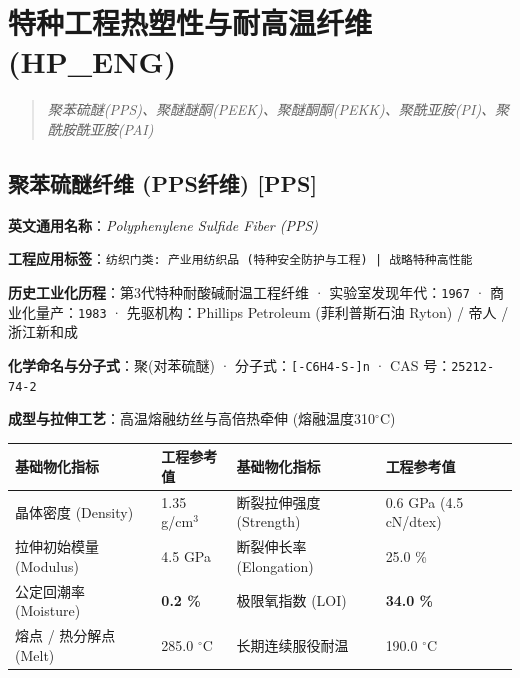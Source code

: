 \documentclass[11pt,openright,twoside,UTF8]{ctexbook}
\begin{document}
\chapter{特种工程热塑性与耐高温纤维 (HP\_ENG)}
\begin{quote}
\small\itshape
聚苯硫醚(PPS)、聚醚醚酮(PEEK)、聚醚酮酮(PEKK)、聚酰亚胺(PI)、聚酰胺酰亚胺(PAI)
\end{quote}

\section{聚苯硫醚纤维 (PPS纤维) [PPS]}
\label{sec:pps}

\noindent\textbf{英文通用名称}：\textit{Polyphenylene Sulfide Fiber (PPS)}\par
\noindent\textbf{工程应用标签}：\texttt{纺织门类: 产业用纺织品 (特种安全防护与工程) | 战略特种高性能}\par
\noindent\textbf{历史工业化历程}：第3代特种耐酸碱耐温工程纤维 · 实验室发现年代：\texttt{1967} · 商业化量产：\texttt{1983} · 先驱机构：Phillips Petroleum (菲利普斯石油 Ryton) / 帝人 / 浙江新和成\par
\noindent\textbf{化学命名与分子式}：聚(对苯硫醚) · 分子式：\texttt{[-C6H4-S-]n} · CAS 号：\texttt{25212-74-2}\par
\noindent\textbf{成型与拉伸工艺}：高温熔融纺丝与高倍热牵伸 (熔融温度310$^\circ\mathrm{C}$)\par

\vspace{0.15cm}
\begin{center}
\small
\begin{tabularx}{\textwidth}{p{3.8cm}Xp{3.8cm}X}
\toprule
\textbf{基础物化指标} & \textbf{工程参考值} & \textbf{基础物化指标} & \textbf{工程参考值} \\
\midrule
晶体密度 (Density) & 1.35 g/cm$^3$ & 断裂拉伸强度 (Strength) & 0.6 GPa (4.5 cN/dtex) \\
拉伸初始模量 (Modulus) & 4.5 GPa & 断裂伸长率 (Elongation) & 25.0 \% \\
公定回潮率 (Moisture) & \textbf{0.2 \%} & 极限氧指数 (LOI) & \textbf{34.0 \%} \\
熔点 / 热分解点 (Melt) & 285.0 $^\circ\mathrm{C}$ & 长期连续服役耐温 & 190.0 $^\circ\mathrm{C}$ \\
\bottomrule
\end{tabularx}
\end{center}
\vspace{0.15cm}
\end{document}
